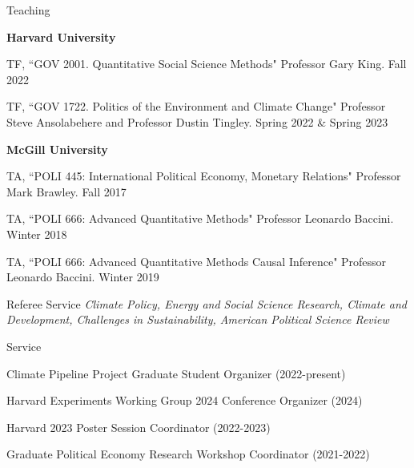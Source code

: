 \documentclass{resume}
\begin{document}
\begin{rSection}{\Large T\MakeLowercase{eaching}} \itemsep -2pt
\vspace{-0.7cm}

\item \textbf{Harvard University} 
\item TF, ``GOV 2001. Quantitative Social Science Methods" Professor Gary King. Fall 2022
\medskip
\item TF, ``GOV 1722. Politics of the Environment and Climate Change" Professor Steve Ansolabehere and Professor Dustin Tingley. Spring 2022 \& Spring 2023


\item \textbf{McGill University} 
\item TA, ``POLI 445: International Political Economy, Monetary Relations" Professor Mark Brawley. Fall 2017


\medskip

\item TA, ``POLI 666: Advanced Quantitative Methods" Professor Leonardo Baccini. Winter 2018

\medskip
\item TA, ``POLI 666: Advanced Quantitative Methods Causal Inference" Professor Leonardo Baccini. Winter 2019

\end{rSection}

\bigskip 

\begin{rSection}{\Large R\MakeLowercase{eferee} S\MakeLowercase{ervice}} \itemsep -2pt
\textit{Climate Policy, Energy and Social Science Research, Climate and Development, Challenges in Sustainability, American Political Science Review}
\end{rSection}

\bigskip

\begin{rSection}{\Large S\MakeLowercase{ervice}} \itemsep -2pt
\vspace{-0.7cm}
\item Climate Pipeline Project Graduate Student Organizer (2022-present)

\item Harvard Experiments Working Group 2024 Conference Organizer (2024)

\item Harvard 2023 Poster Session Coordinator (2022-2023)

\item Graduate Political Economy Research Workshop Coordinator (2021-2022)

\end{rSection} 
\end{document}
